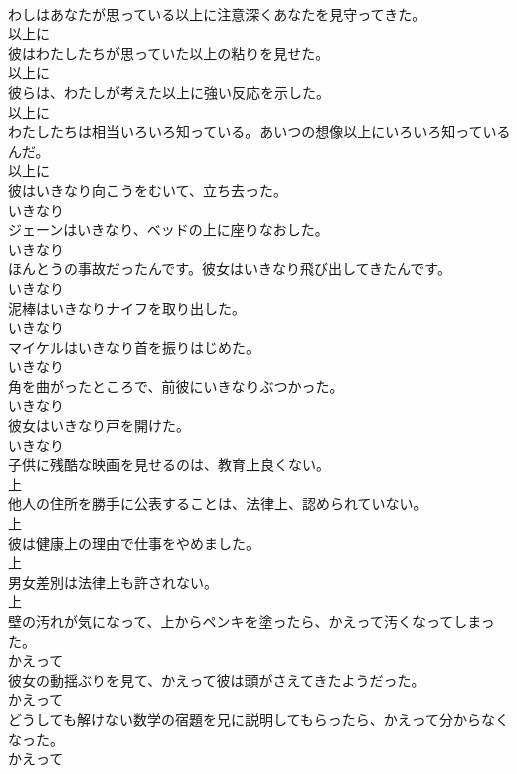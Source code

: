 \documentclass[8pt]{extreport}
\begin{document}
\begin{CJK}{UTF8}{min}
\\	わしはあなたが思っている以上に注意深くあなたを見守ってきた。	
\\	以上に
\\	彼はわたしたちが思っていた以上の粘りを見せた。	
\\	以上に
\\	彼らは、わたしが考えた以上に強い反応を示した。	
\\	以上に
\\	わたしたちは相当いろいろ知っている。あいつの想像以上にいろいろ知っているんだ。	
\\	以上に
\\	彼はいきなり向こうをむいて、立ち去った。	
\\	いきなり
\\	ジェーンはいきなり、ベッドの上に座りなおした。	
\\	いきなり
\\	ほんとうの事故だったんです。彼女はいきなり飛び出してきたんです。	
\\	いきなり
\\	泥棒はいきなりナイフを取り出した。	
\\	いきなり
\\	マイケルはいきなり首を振りはじめた。	
\\	いきなり
\\	角を曲がったところで、前彼にいきなりぶつかった。	
\\	いきなり
\\	彼女はいきなり戸を開けた。	
\\	いきなり
\\	子供に残酷な映画を見せるのは、教育上良くない。	
\\	上
\\	他人の住所を勝手に公表することは、法律上、認められていない。	
\\	上
\\	彼は健康上の理由で仕事をやめました。	
\\	上
\\	男女差別は法律上も許されない。	
\\	上
\\	壁の汚れが気になって、上からペンキを塗ったら、かえって汚くなってしまった。	
\\	かえって
\\	彼女の動揺ぶりを見て、かえって彼は頭がさえてきたようだった。	
\\	かえって
\\	どうしても解けない数学の宿題を兄に説明してもらったら、かえって分からなくなった。	
\\	かえって

\end{CJK}
\end{document}
